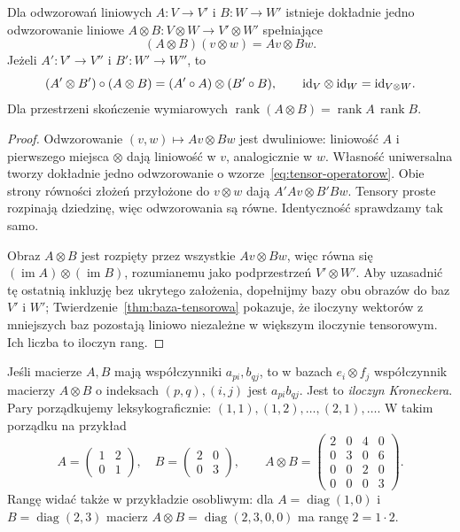\begin{twierdzenie}
\label{thm:tensor-operatorow}
Dla odwzorowań liniowych $A\colon V\to V'$ i $B\colon W\to W'$
istnieje dokładnie jedno odwzorowanie liniowe
$A\otimes B\colon V\otimes W\to V'\otimes W'$ spełniające
\begin{equation}\label{eq:tensor-operatorow}
 (A\otimes B)(v\otimes w)=Av\otimes Bw.
\end{equation}
Jeżeli $A'\colon V'\to V''$ i $B'\colon W'\to W''$, to
\[
 (A'\otimes B')\circ(A\otimes B)=(A'\circ A)\otimes(B'\circ B),
 \qquad \mathrm{id}_V\otimes\mathrm{id}_W=\mathrm{id}_{V\otimes W}.
\]
Dla przestrzeni skończenie wymiarowych
$\operatorname{rank}(A\otimes B)=\operatorname{rank}A\,\operatorname{rank}B$.
\end{twierdzenie}
\begin{proof}
Odwzorowanie $(v,w)\mapsto Av\otimes Bw$ jest dwuliniowe:
liniowość $A$ i pierwszego miejsca $\otimes$ dają
liniowość w $v$, analogicznie w $w$. Własność uniwersalna
tworzy dokładnie jedno odwzorowanie o wzorze~\eqref{eq:tensor-operatorow}.
Obie strony równości złożeń przyłożone do $v\otimes w$
dają $A'Av\otimes B'Bw$. Tensory proste rozpinają dziedzinę,
więc odwzorowania są równe. Identyczność sprawdzamy tak samo.

Obraz $A\otimes B$ jest rozpięty przez wszystkie $Av\otimes Bw$,
więc równa się $(\operatorname{im}A)\otimes(\operatorname{im}B)$,
rozumianemu jako podprzestrzeń $V'\otimes W'$.
Aby uzasadnić tę ostatnią inkluzję bez ukrytego założenia,
dopełnijmy bazy obu obrazów do baz $V'$ i $W'$;
Twierdzenie~\ref{thm:baza-tensorowa} pokazuje, że iloczyny
wektorów z mniejszych baz pozostają liniowo niezależne
w większym iloczynie tensorowym. Ich liczba to iloczyn rang.
\end{proof}

Jeśli macierze $A,B$ mają współczynniki $a_{pi},b_{qj}$,
to w bazach $e_i\otimes f_j$ współczynnik macierzy
$A\otimes B$ o indeksach $(p,q),(i,j)$ jest $a_{pi}b_{qj}$.
Jest to \emph{iloczyn Kroneckera}. Pary porządkujemy
leksykograficznie: $(1,1),(1,2),\ldots,(2,1),\ldots$.
W takim porządku na przykład
\[
 A=\begin{pmatrix}1&2\\0&1\end{pmatrix},\quad
 B=\begin{pmatrix}2&0\\0&3\end{pmatrix},\qquad
 A\otimes B=
 \begin{pmatrix}
 2&0&4&0\\0&3&0&6\\0&0&2&0\\0&0&0&3
 \end{pmatrix}.
\]
Rangę widać także w przykładzie osobliwym: dla
$A=\operatorname{diag}(1,0)$ i $B=\operatorname{diag}(2,3)$
macierz $A\otimes B=\operatorname{diag}(2,3,0,0)$ ma
rangę $2=1\cdot2$.

